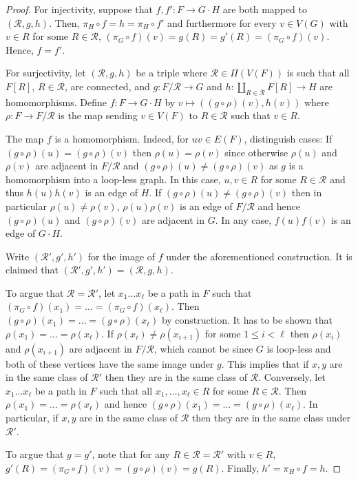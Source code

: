 \documentclass[3p,final]{elsarticle}
\begin{document}
\begin{proof}
		For injectivity, suppose that $f, f' \colon F \to G \cdot H$ are both mapped to $(\mathcal{R}, g, h)$. Then, $\pi_H \circ f = h = \pi_H \circ f'$ and furthermore for every $v \in V(G)$ with $v \in R$ for some $R \in \mathcal{R}$, $(\pi_G \circ f) (v) = g(R) = g'(R) = (\pi_G \circ f)(v)$. Hence, $f = f'$. 
		
		For surjectivity, let $(\mathcal{R}, g, h)$ be a triple where $\mathcal{R} \in \Pi(V(F))$ is such that all $F[R]$, $R \in \mathcal{R}$, are connected, and $g \colon F/\mathcal{R} \to G$ and $h \colon \coprod_{R \in \mathcal{R}} F[R] \to H$ are homomorphisms.
		Define $f \colon F \to G \cdot H$ by $v \mapsto ((g \circ \rho) (v), h(v))$ where $\rho \colon F \to F/\mathcal{R}$ is the map sending $v \in V(F)$ to $R \in \mathcal{R}$ such that $v \in R$.
		
		The map $f$ is a homomorphism. Indeed, for $uv \in E(F)$, distinguish cases: If $(g \circ \rho)(u) = (g \circ \rho)(v)$ then $\rho(u) = \rho(v)$ since otherwise $\rho(u)$ and $\rho(v)$ are adjacent in $F/\mathcal{R}$ and $(g \circ \rho)(u) \neq (g \circ \rho)(v)$ as $g$ is a homomorphism into a loop-less graph.
		In this case, $u, v \in R$ for some $R \in \mathcal{R}$ and thus $h(u)h(v)$ is an edge of $H$.
		If $(g \circ \rho)(u) \neq (g \circ \rho)(v)$ then in particular $\rho(u) \neq \rho(v)$, $\rho(u)\rho(v)$ is an edge of $F/\mathcal{R}$ and hence $(g \circ \rho)(u)$ and $(g \circ \rho)(v)$ are adjacent in $G$.
		In any case, $f(u)f(v)$ is an edge of $G \cdot H$.
		
		Write $(\mathcal{R}', g', h')$ for the image of $f$ under the aforementioned construction. It is claimed that $(\mathcal{R}', g', h') = (\mathcal{R}, g, h)$.
		
		To argue that $\mathcal{R} = \mathcal{R}'$, let $x_1 \dots x_\ell$ be a path in $F$ such that $(\pi_G \circ f)(x_1) = \dots = (\pi_G \circ f)(x_\ell)$.
		Then $(g \circ \rho)(x_1) = \dots = (g \circ \rho)(x_\ell)$ by construction. It has to be shown that $\rho(x_1) = \dots = \rho(x_\ell)$. If $\rho(x_i) \neq \rho(x_{i+1})$ for some $1 \leq i < \ell$ then $\rho(x_i)$ and $\rho(x_{i+1})$ are adjacent in $F/\mathcal{R}$, which cannot be since $G$ is loop-less and both of these vertices have the same image under $g$. This implies that if $x, y $ are in the same class of $\mathcal{R}'$ then they are in the same class of $\mathcal{R}$.
		Conversely, let $x_1 \dots x_\ell$ be a path in $F$ such that all $x_1,\dots, x_\ell \in R$ for some $R \in \mathcal{R}$.
		Then $\rho(x_1) = \dots = \rho(x_\ell)$ and hence $(g \circ \rho)(x_1) = \dots = (g \circ \rho)(x_\ell)$. In particular, if $x, y $ are in the same class of $\mathcal{R}$ then they are in the same class under $\mathcal{R}'$.
		
		To argue that $g = g'$, note that for any $R \in \mathcal{R} = \mathcal{R}'$ with $v \in R$, $g'(R) = (\pi_G \circ f)(v) = (g \circ \rho)(v) = g(R)$.
		Finally, $h' = \pi_H \circ f = h$.
	\end{proof}
	
\end{document}
